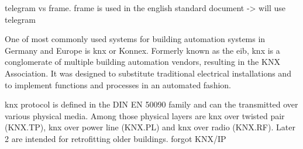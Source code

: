 \alert{telegram vs frame. frame is used in the english standard document -> will use telegram}

One of most commonly used systems for building automation systems in Germany and Europe is \Gls{knx} or Konnex. Formerly known as the \gls{eib}, \gls{knx} is a \alert{conglomerate} of multiple building automation vendors, resulting in the KNX Association. 
It was designed to substitute traditional electrical installations and to implement functions and processes in an automated fashion. \parencite{Merz2009}

\Gls{knx} protocol is defined in the DIN EN 50090 family and can the transmitted over various physical media. Among those physical layers are \gls{knx} over twisted pair (KNX.TP), \gls{knx} over power line (KNX.PL) and \gls{knx} over radio (KNX.RF). Later 2 are intended for retrofitting older buildings. \parencite{Merz2009}
\alert{forgot KNX/IP}

